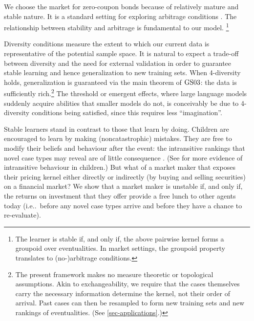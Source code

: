 \documentclass[ecta,nameyear,draft]{econsocart}
\makeatletter
\newcommand\ie{i\@.e\@ifnextchar.{}{.\@}}
\newcommand{\gsii}{$\textup{GS03}$}
\theoremstyle{plain}
\theoremstyle{remark}
\makeatother
\begin{document}
We choose the market for zero-coupon bonds because of relatively mature and
stable nature. It is a standard setting for exploring arbitrage conditions
\citep{barillas2019speculation}. The relationship between stability and
arbitrage is fundamental to our model.
\footnote{The learner is stable if, and
  only if, the above pairwise kernel forms a groupoid over eventualities. In
  market settings, the groupoid property translates to (no-)arbitrage
conditions.}

Diversity conditions measure the extent to which our current data is
representative of the potential sample space. It is natural to expect a
trade-off between diversity and the need for external validation in order to
guarantee stable learning and hence generalization to new training sets. When
4-diversity holds, generalization is guaranteed via the main theorem of \gsii:
the data is sufficiently rich.\footnote{The present framework makes no measure
  theoretic or topological assumptions. Akin to exchangeability, we require
  that the cases themselves carry the necessary information determine the
  kernel, not their order of arrival. Past cases can then be resampled to form
  new training sets and new rankings of eventualities. (See
\cref{sec-applications}.)} The threshold or emergent effects, where large
language models suddenly acquire abilities that smaller models do not, is
conceivably be due to 4-diversity conditions being satisfied, since this
requires less ``imagination''.

Stable learners stand in contrast to those that learn by doing. Children are
encouraged to learn by making (noncatastrophic) mistakes. They are free to
modify their beliefs and behaviour after the event: the intransitive rankings
that novel case types may reveal are of little consequence
\citep{bradbury1990effects}. (See
\citep{weinstein1968transitivity,bradbury1974transitivity} for more evidence of
intransitive behaviour in children.) But what of a market maker that exposes
their pricing kernel either directly or indirectly (by buying and selling
securities) on a financial market? We show that a market maker is unstable if,
and only if, the returns on investment that they offer provide a free lunch to
other agents today (\ie\ before any novel case types arrive and before they
have a chance to re-evaluate).
\end{document}
